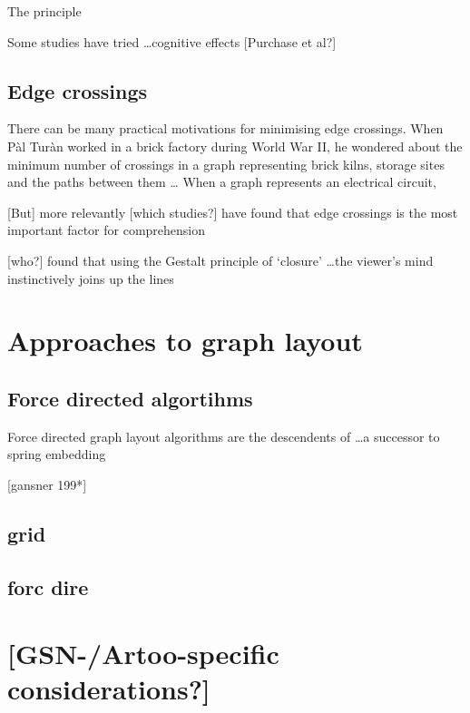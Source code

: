 The principle 

Some studies have tried \ldots cognitive effects [Purchase et al?]


\subsection{Edge crossings}

There can be many practical motivations for minimising edge crossings.
When P\`{a}l Tur\`{a}n worked in a brick factory during World War II,
he wondered about the minimum number of crossings in a graph representing
brick kilns, storage sites and the paths between them \ldots
When a graph represents an electrical circuit, 

[But] more relevantly [which studies?] have found that edge crossings is the most important factor for comprehension

[who?] found that using the Gestalt principle of `closure' \ldots the viewer's mind instinctively joins up the lines




\section{Approaches to graph layout}

\subsection{Force directed algortihms}

Force directed graph layout algorithms are the descendents of  \citet{tutte} \ldots a successor to \citet{tutte} spring embedding

[gansner 199*]

\subsection{grid}




\subsection{forc dire}








\section{[GSN-/Artoo-specific considerations?]}

